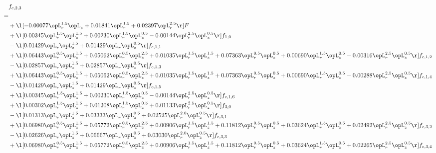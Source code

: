 \begin{alignat}{2} 
\label{eq:f_23_1} 
& f_{c,2,3} \nonumber \\ 
 = \\ 
& + \l[  -0.00077 \opL_r^{1.5} \opL_z +  0.01841 \opL_r^{1.5} +  0.02397 \opL_r^{2.5}  \r] F \nonumber \\ 
& + \l[  0.00345 \opL_r^{1.5} \opL_z^{1.5} +  0.00230 \opL_r^{1.5} \opL_z^{0.5}   -0.00144 \opL_r^{2.5} \opL_z^{0.5}  \r] f_{1,0} \nonumber \\ 
& - \l[  0.01429 \opL_r \opL_z^{1.5} +  0.01429 \opL_r \opL_z^{0.5}  \r] f_{c,1,1} \nonumber \\ 
& + \l[  0.06443 \opL_r^{0.5} \opL_z^{1.5} +  0.05062 \opL_r^{0.5} \opL_z^{2.5} +  0.01035 \opL_r^{1.5} \opL_z^{1.5} +  0.07363 \opL_r^{0.5} \opL_z^{0.5} +  0.00690 \opL_r^{1.5} \opL_z^{0.5}   -0.00316 \opL_r^{2.5} \opL_z^{0.5}  \r] f_{c,1,2} \nonumber \\ 
& - \l[  0.02857 \opL_r \opL_z^{1.5} +  0.02857 \opL_r \opL_z^{0.5}  \r] f_{c,1,3} \nonumber \\ 
& + \l[  0.06443 \opL_r^{0.5} \opL_z^{1.5} +  0.05062 \opL_r^{0.5} \opL_z^{2.5} +  0.01035 \opL_r^{1.5} \opL_z^{1.5} +  0.07363 \opL_r^{0.5} \opL_z^{0.5} +  0.00690 \opL_r^{1.5} \opL_z^{0.5}   -0.00288 \opL_r^{2.5} \opL_z^{0.5}  \r] f_{c,1,4} \nonumber \\ 
& - \l[  0.01429 \opL_r \opL_z^{1.5} +  0.01429 \opL_r \opL_z^{0.5}  \r] f_{c,1,5} \nonumber \\ 
& + \l[  0.00345 \opL_r^{1.5} \opL_z^{1.5} +  0.00230 \opL_r^{1.5} \opL_z^{0.5}   -0.00144 \opL_r^{2.5} \opL_z^{0.5}  \r] f_{c,1,6} \nonumber \\ 
& + \l[  0.00302 \opL_r^{1.5} \opL_z^{1.5} +  0.01208 \opL_r^{1.5} \opL_z^{0.5} +  0.01133 \opL_r^{2.5} \opL_z^{0.5}  \r] f_{3,0} \nonumber \\ 
& - \l[  0.01313 \opL_r \opL_z^{1.5} +  0.03333 \opL_r \opL_z^{0.5} +  0.02525 \opL_r^{2.0} \opL_z^{0.5}  \r] f_{c,3,1} \nonumber \\ 
& + \l[  0.06980 \opL_r^{0.5} \opL_z^{1.5} +  0.05772 \opL_r^{0.5} \opL_z^{2.5} +  0.00906 \opL_r^{1.5} \opL_z^{1.5} +  0.11812 \opL_r^{0.5} \opL_z^{0.5} +  0.03624 \opL_r^{1.5} \opL_z^{0.5} +  0.02492 \opL_r^{2.5} \opL_z^{0.5}  \r] f_{c,3,2} \nonumber \\ 
& - \l[  0.02626 \opL_r \opL_z^{1.5} +  0.06667 \opL_r \opL_z^{0.5} +  0.03030 \opL_r^{2.0} \opL_z^{0.5}  \r] f_{c,3,3} \nonumber \\ 
& + \l[  0.06980 \opL_r^{0.5} \opL_z^{1.5} +  0.05772 \opL_r^{0.5} \opL_z^{2.5} +  0.00906 \opL_r^{1.5} \opL_z^{1.5} +  0.11812 \opL_r^{0.5} \opL_z^{0.5} +  0.03624 \opL_r^{1.5} \opL_z^{0.5} +  0.02265 \opL_r^{2.5} \opL_z^{0.5}  \r] f_{c,3,4} \nonumber \\ 

\end{alignat}
